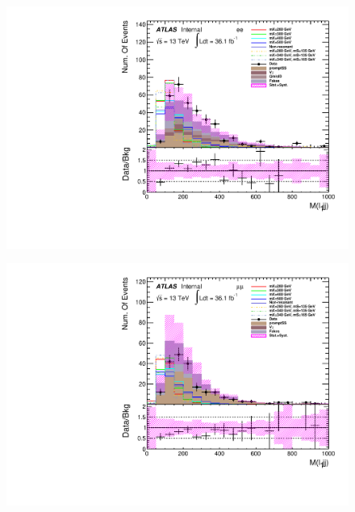 \begin{figure}[h]
\begin{minipage}[t]{0.33\linewidth}
 \includegraphics[width=1.0\textwidth,angle=-90]{fig/dataMC_high_Njet_CR/m_l1jj_ee.pdf}\label{fig:dataMC_high_Njet_CR:m_l1jj_ee.pdf}
 \end{minipage}
  \begin{minipage}[t]{0.33\linewidth}
 \centering
 \includegraphics[width=1.0\textwidth,angle=-90]{fig/dataMC_high_Njet_CR/m_l1jj_mumu.pdf}\label{fig:dataMC_high_Njet_CR:m_l1jj_mumu.pdf}
 \end{minipage}
 \begin{minipage}[t]{0.33\linewidth}
 \centering

\end{minipage}
\end{figure}

